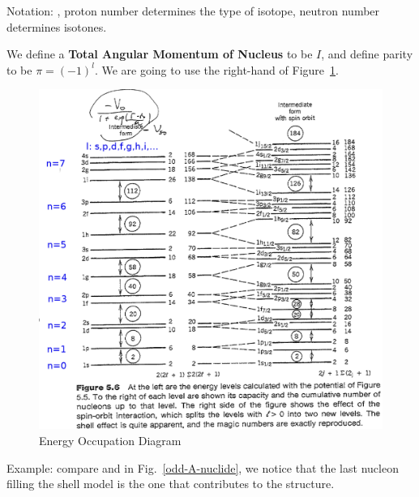\documentclass{school-22.101-notes}
\date{November 9, 2011}
\begin{document}
\maketitle


Notation: , proton number determines the type of isotope, neutron number determines isotones.  

We define a \textbf{Total Angular Momentum of Nucleus} to be $I$, and define parity to be $\pi = (-1)^l$. We are going to use the right-hand of Figure~\ref{ns-magic-numbers}.
\begin{figure}[ht]
    \centering
    \includegraphics[width=5in]{images/ns/magic-numbers.png}
    \caption{Energy Occupation Diagram}
    \label{ns-magic-numbers}
\end{figure}

\clearpage
{} 
Example: compare  and  in Fig.~\ref{odd-A-nuclide}, we notice that the last nucleon filling the shell model is the one that contributes to the structure. 
\end{document}
